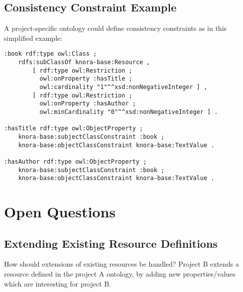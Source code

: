 \documentclass[12pt, a4paper]{article}
\begin{document}
\subsection{Consistency Constraint Example}

A project-specific ontology could define consistency constraints as in this simplified example:

\begin{verbatim}
:book rdf:type owl:Class ;
    rdfs:subClassOf knora-base:Resource ,
        [ rdf:type owl:Restriction ;
          owl:onProperty :hasTitle ;
          owl:cardinality "1"^^xsd:nonNegativeInteger ] ,
        [ rdf:type owl:Restriction ;
          owl:onProperty :hasAuthor ;
          owl:minCardinality "0"^^xsd:nonNegativeInteger ] .

:hasTitle rdf:type owl:ObjectProperty ;
    knora-base:subjectClassConstraint :book ;
    knora-base:objectClassConstraint knora-base:TextValue .

:hasAuthor rdf:type owl:ObjectProperty ;
    knora-base:subjectClassConstraint :book ;
    knora-base:objectClassConstraint knora-base:TextValue .
\end{verbatim}

\section{Open Questions}

\subsection{Extending Existing Resource Definitions}

How should extensions of existing resources be handled? Project B extends a resource defined in the project A ontology, by adding new properties/values which are interesting for project B.

\printbibliography
\end{document}
